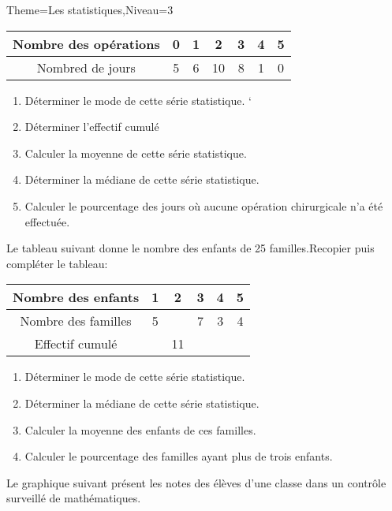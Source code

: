 \documentclass[a4paper,12pt]{article}
\begin{document}
\begin{Maquette}[Fiche]{Theme=Les statistiques,Niveau=3}
\begin{exercice}
\begin{tabular}{|c|c|c|c|c|c|c|}
\hline 
Nombre des opérations & 0 & 1 & 2 & 3 & 4 & 5 \\ 
\hline 
Nombred de jours & 5 & 6 & 10 & 8 & 1 & 0 \\ 
\hline 
\end{tabular} 
\begin{enumerate}
\item Déterminer le mode de cette série statistique.
`\item Déterminer l'effectif cumulé 
\item Calculer la moyenne de cette série statistique.
\item Déterminer la médiane de cette série statistique.
\item Calculer le pourcentage des jours où aucune opération chirurgicale n'a été effectuée.
\end{enumerate}
\end{exercice}

\begin{exercice}
Le tableau suivant donne le nombre des enfants de 25 familles.Recopier puis compléter le tableau:
\begin{tabular}{|c|c|c|c|c|c|}
\hline 
Nombre des enfants & 1 & 2 & 3 & 4 & 5 \\ 
\hline 
Nombre des familles & 5 &  & 7 & 3 & 4 \\ 
\hline 
Effectif cumulé &  & 11 &  &  &  \\ 
\hline 
\end{tabular}
\begin{enumerate}
\item Déterminer le mode de cette série statistique.
\item Déterminer la médiane de cette série statistique.
\item Calculer la moyenne des enfants de ces familles.
\item Calculer le pourcentage des familles ayant plus de trois enfants.
\end{enumerate}
\end{exercice}

\begin{exercice}
Le graphique suivant présent les notes des élèves d'une classe dans un contrôle surveillé de mathématiques.


\end{exercice}
\end{Maquette}
\end{document}
